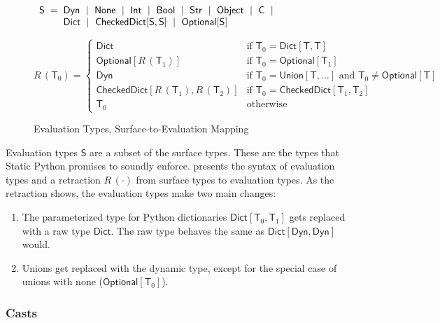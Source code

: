 \documentclass[english,cleveref,submission]{programming}
\makeatletter
\newcommand{\SP}{Static Python}
\newcommand{\defeq}{=}
\newcommand{\mfeq}{=}
\newcommand{\langmid}{~\mid~} %
\newenvironment{langarray}{\(\begin{array}{l@{\hspace{2mm}}c@{\hspace{2mm}}l}}{\end{array}\)}
\newcommand{\typefont}[1]{\mathsf{#1}}
\newcommand{\paramtype}[2]{#1[#2]}
\newcommand{\sptype}{\typefont{T}}
\newcommand{\spteval}{\typefont{S}}
\newcommand{\sptclass}{\typefont{C}}
\newcommand{\sptint}{\typefont{Int}}
\newcommand{\sptstr}{\typefont{Str}}
\newcommand{\sptbool}{\typefont{Bool}}
\newcommand{\sptdyn}{\typefont{Dyn}}
\newcommand{\sptobject}{\typefont{Object}}
\newcommand{\sptnone}{\typefont{None}}
\newcommand{\sptoptional}[1]{\paramtype{\typefont{Optional}}{#1}}
\newcommand{\sptunion}[1]{\paramtype{\typefont{Union}}{#1}}
\newcommand{\sptrawpydict}{\typefont{Dict}}
\newcommand{\sptrawchkdict}{\typefont{CheckedDict}} %
\newcommand{\sptpydict}[2]{\paramtype{\sptrawpydict}{#1, #2}}
\newcommand{\sptchkdict}[2]{\paramtype{\sptrawchkdict}{#1, #2}}
\newcommand{\mfapply}[2]{#1\,(#2)}
\newcommand{\mffont}[1]{\mathit{#1}}
\newcommand{\mftypeF}[1]{\mfapply{\mffont{R}}{#1}} %
\makeatother
\begin{document}
\begin{figure}[t]
  \begin{langarray}
    \spteval & \defeq &
      \sptdyn \langmid
      \sptnone \langmid
      \sptint \langmid
      \sptbool \langmid
      \sptstr \langmid
      \sptobject \langmid
      \sptclass \langmid
    \\ & &
      \sptrawpydict \langmid
      \sptchkdict{\spteval}{\spteval} \langmid
      \sptoptional{\spteval}
  \end{langarray}

  \bigskip
  \(
    \mftypeF{\sptype_0}
    \mfeq
    \left\{\begin{array}{ll}
      \sptrawpydict & \mbox{if $\sptype_0 = \sptpydict{\sptype}{\sptype}$}
    \\
      \sptoptional{\mftypeF{\sptype_1}} & \mbox{if $\sptype_0 = \sptoptional{\sptype_1}$}
    \\
      \sptdyn & \mbox{if $\sptype_0 = \sptunion{\sptype, \ldots}$ and $\sptype_0 \neq \sptoptional{\sptype}\!\!\!\!$}
    \\
      \sptchkdict{\mftypeF{\sptype_1}}{\mftypeF{\sptype_2}} & \mbox{if $\sptype_0 = \sptchkdict{\sptype_1}{\sptype_2}$}
    \\
      \sptype_0 & \mbox{otherwise}
    \end{array}\right.
  \)

  \caption{Evaluation Types, Surface-to-Evaluation Mapping}
  \label{f:surface-to-eval-types}
\end{figure}

Evaluation types $\spteval$ are a subset of the surface types.
These are the types that \SP{} promises to soundly enforce.
 presents the syntax of evaluation types
and a retraction $\mftypeF{\cdot}$ from surface types to evaluation types.
As the retraction shows, the evaluation types make two main changes:
\begin{enumerate}
  \item
    The parameterized type for Python dictionaries
    $\sptpydict{\sptype_0}{\sptype_1}$ gets replaced with
    a raw type $\sptrawpydict$.
    The raw type behaves the same as $\sptpydict{\sptdyn}{\sptdyn}$ would.
  \item
    Unions get replaced with the dynamic type, except for the special case
    of unions with none ($\sptoptional{\sptype_0}$).
\end{enumerate}


\subsubsection{Casts}
\end{document}
